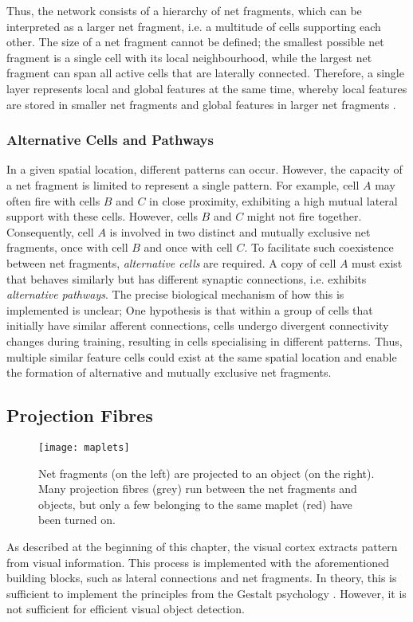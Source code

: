 Thus, the network consists of a hierarchy of net fragments, which can be interpreted as a larger net fragment, i.e. a multitude of cells supporting each other.
The size of a net fragment cannot be defined; the smallest possible net fragment is a single cell with its local neighbourhood, while the largest net fragment can span all active cells that are laterally connected.
Therefore, a single layer represents local and global features at the same time, whereby local features are stored in smaller net fragments and global features in larger net fragments \cite{von_der_malsburg_theory_2022}.

\subsubsection{Alternative Cells and Pathways}
In a given spatial location, different patterns can occur.
However, the capacity of a net fragment is limited to represent a single pattern.
For example, cell $A$ may often fire with cells $B$ and $C$ in close proximity, exhibiting a high mutual lateral support with these cells.
However, cells $B$ and $C$ might not fire together. Consequently, cell $A$ is involved in two distinct and mutually exclusive net fragments, once with cell $B$ and once with cell $C$.
To facilitate such coexistence between net fragments, \emph{alternative cells} are required. A copy of cell $A$ must exist that behaves similarly but has different synaptic connections, i.e. exhibits \emph{alternative pathways}.
The precise biological mechanism of how this is implemented is unclear; One hypothesis is that within a group of cells that initially have similar afferent connections, cells undergo divergent connectivity changes during training, resulting in cells specialising in different patterns. Thus, multiple similar feature cells could exist at the same spatial location and enable the formation of alternative and mutually exclusive net fragments.


\subsection{Projection Fibres}
\begin{figure}[h]
    \centering
    \texttt{[image: maplets]}
    \caption[An active maplet mapping net fragments to object prototypes]{Net fragments (on the left) are projected to an object (on the right). Many projection fibres (grey) run between the net fragments and objects, but only a few belonging to the same maplet (red) have been turned on.}
\end{figure}
%
As described at the beginning of this chapter, the visual cortex extracts pattern from visual information. This process is implemented with the aforementioned building blocks, such as lateral connections and net fragments. In theory, this is sufficient to implement the principles from the Gestalt psychology \cite{ellis_source_1938, kohler_gestalt_1992, wagemans_century_2012, hamlyn_psychology_2017}. However, it is not sufficient for efficient visual object detection.

